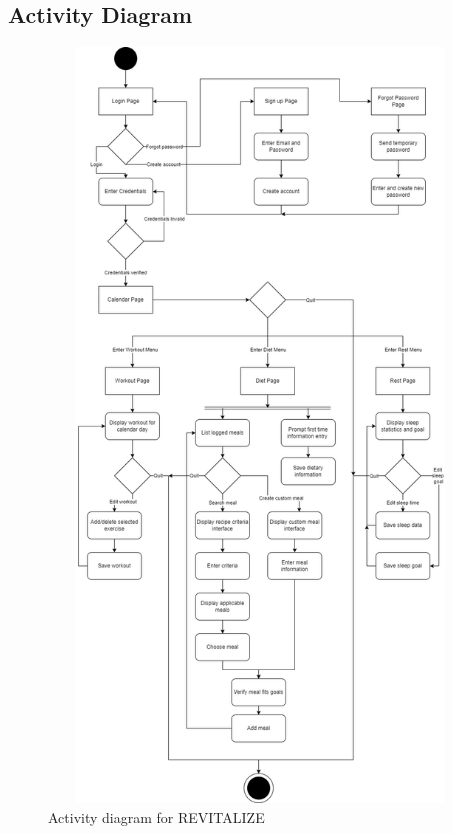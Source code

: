 \documentclass[12pt,letterpaper]{article}
\begin{document}
\subsection{Activity Diagram}
\begin{figure}[H]
	\centering
	\includegraphics[width=15cm, height=20cm]{4G06SRSActivityDiagram.png}
	\caption{Activity diagram for REVITALIZE}
\end{figure}
\end{document}
